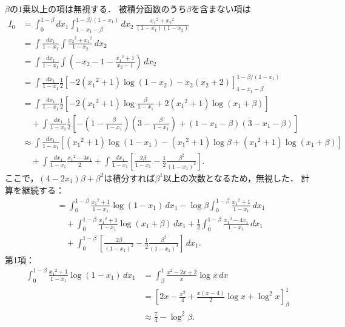 $\beta$の$1$乗以上の項は無視する．
被積分函数のうち$\beta$を含まない項は
\begin{align*}
  I_0 &= \int_0^{1-\beta} dx_1 \int_{1-x_1-\beta}^{1-\beta/(1-x_1)} dx_2 \,
  \frac{x_1{}^2 + x_2{}^2}{(1-x_1)(1-x_2)} \\
  &= \int \frac{dx_1}{1-x_1} \int \frac{x_2{}^2 + x_1{}^2}{1-x_2} \, dx_2 \\
  &= \int \frac{dx_1}{1-x_1} \int \left( -x_2 - 1 - \frac{x_1{}^2 + 1}{x_2 - 1} \right) \, dx_2 \\
  &= \int \frac{dx_1}{1-x_1} \frac{1}{2} \left[ -2 (x_1{}^2 + 1) \log (1-x_2) - x_2(x_2 + 2) \right]_{1-x_1-\beta}^{1-\beta/(1-x_1)} \\
  &= \int \frac{dx_1}{1-x_1} \frac{1}{2} \left[ -2 (x_1{}^2 + 1) \log \frac{\beta}{1-x_1} + 2 (x_1{}^2 + 1) \log (x_1 + \beta) \right] \\
  & \quad + \int \frac{dx_1}{1-x_1} \frac{1}{2} \left[ - \left( 1 - \frac{\beta}{1-x_1} \right) \left( 3 - \frac{\beta}{1-x_1} \right) + (1 - x_1 -\beta)(3 - x_1 - \beta) \right] \\
  &\approx \int \frac{dx_1}{1-x_1} \left[ (x_1{}^2 + 1) \log (1 - x_1) - (x_1{}^2 + 1) \log \beta + (x_1{}^2 + 1) \log (x_1 + \beta) \right] \\
  & \quad + \int \frac{dx_1}{1-x_1} \frac{x_1{}^2 - 4x_1}{2}
  + \int \frac{dx_1}{1-x_1} \left[ \frac{2\beta}{1-x_1} - \frac{1}{2} \frac{\beta^2}{(1-x_1)^2} \right] .
\end{align*}
ここで，$(4-2x_1)\beta + \beta^2$は積分すれば$\beta^1$以上の次数となるため，無視した．
計算を継続する：
\begin{align*}
  &= \int_0^{1-\beta} \frac{x_1{}^2 + 1}{1 - x_1} \log(1 - x_1) \, dx_1
  - \log\beta \int_0^{1-\beta} \frac{x_1{}^2 + 1}{1 - x_1} \, dx_1 \\
  & \quad + \int_0^{1-\beta} \frac{x_1{}^2 + 1}{1 - x_1} \log(x_1 + \beta) \, dx_1
  + \frac{1}{2} \int_0^{1-\beta} \frac{x_1{}^2 - 4x_1}{1-x_1} \, dx_1 \\
  & \quad + \int_0^{1-\beta} \left[ \frac{2\beta}{(1-x_1)^2} - \frac{1}{2} \frac{\beta^2}{(1-x_1)^3} \right] \, dx_1 .
\end{align*}
第1項：
\begin{align*}
  \int_0^{1-\beta} \frac{x_1{}^2 + 1}{1 - x_1} \log(1 - x_1) \, dx_1
  &= \int_\beta^1 \frac{x^2 - 2x + 2}{x} \log x \, dx \\
  &= \left[ 2x - \frac{x^2}{4} + \frac{x(x-4)}{2} \log x + \log^2 x \right]_\beta^1 \\
  &\approx \frac{7}{4} - \log^2 \beta .
\end{align*}
